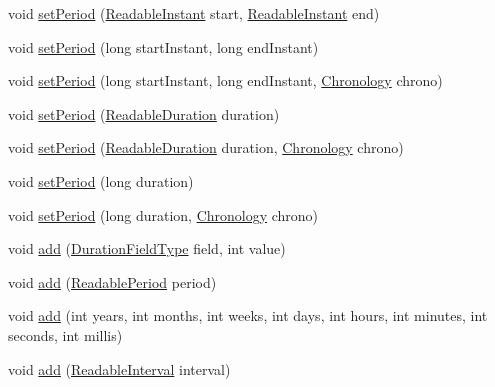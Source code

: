 \begin{DoxyCompactItemize}
\item 
void \hyperlink{classorg_1_1joda_1_1time_1_1_mutable_period_a7814288ef21244d2d65cecfa58f4cf29}{set\-Period} (\hyperlink{interfaceorg_1_1joda_1_1time_1_1_readable_instant}{Readable\-Instant} start, \hyperlink{interfaceorg_1_1joda_1_1time_1_1_readable_instant}{Readable\-Instant} end)
\item 
void \hyperlink{classorg_1_1joda_1_1time_1_1_mutable_period_a9610c75531c27b1e2970a3d55c57de9b}{set\-Period} (long start\-Instant, long end\-Instant)
\item 
void \hyperlink{classorg_1_1joda_1_1time_1_1_mutable_period_abdc61a08c1b4d1d371d35ba7d84303ca}{set\-Period} (long start\-Instant, long end\-Instant, \hyperlink{classorg_1_1joda_1_1time_1_1_chronology}{Chronology} chrono)
\item 
void \hyperlink{classorg_1_1joda_1_1time_1_1_mutable_period_aae7af8dd120f48cd0ac834879b7f1f72}{set\-Period} (\hyperlink{interfaceorg_1_1joda_1_1time_1_1_readable_duration}{Readable\-Duration} duration)
\item 
void \hyperlink{classorg_1_1joda_1_1time_1_1_mutable_period_a2ca61b44b079dd3e1ee8d52a79ef5b0a}{set\-Period} (\hyperlink{interfaceorg_1_1joda_1_1time_1_1_readable_duration}{Readable\-Duration} duration, \hyperlink{classorg_1_1joda_1_1time_1_1_chronology}{Chronology} chrono)
\item 
void \hyperlink{classorg_1_1joda_1_1time_1_1_mutable_period_a7c12f3a81fef84094f5eca94f6e9f6f7}{set\-Period} (long duration)
\item 
void \hyperlink{classorg_1_1joda_1_1time_1_1_mutable_period_a4e8ec92c742c1dcaae2bb8a4ebc3154f}{set\-Period} (long duration, \hyperlink{classorg_1_1joda_1_1time_1_1_chronology}{Chronology} chrono)
\item 
void \hyperlink{classorg_1_1joda_1_1time_1_1_mutable_period_a5bbbb67bfb3a59a7c96222e13bed4752}{add} (\hyperlink{classorg_1_1joda_1_1time_1_1_duration_field_type}{Duration\-Field\-Type} field, int value)
\item 
void \hyperlink{classorg_1_1joda_1_1time_1_1_mutable_period_aa41ae8836ff00feafdc9431c60c16cd9}{add} (\hyperlink{interfaceorg_1_1joda_1_1time_1_1_readable_period}{Readable\-Period} period)
\item 
void \hyperlink{classorg_1_1joda_1_1time_1_1_mutable_period_a4572fc199406fe89650bfe4a203658e1}{add} (int years, int months, int weeks, int days, int hours, int minutes, int seconds, int millis)
\item 
void \hyperlink{classorg_1_1joda_1_1time_1_1_mutable_period_a2f828c3c625325b938a6035b2503e215}{add} (\hyperlink{interfaceorg_1_1joda_1_1time_1_1_readable_interval}{Readable\-Interval} interval)

\end{DoxyCompactItemize}
